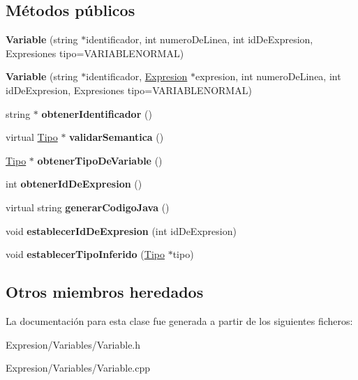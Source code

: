 \subsection*{Métodos públicos}
\begin{DoxyCompactItemize}
\item 
\hypertarget{class_variable_a1ec4d6eb71b53767f57f4fd47af3a857}{{\bfseries Variable} (string $\ast$identificador, int numero\-De\-Linea, int id\-De\-Expresion, Expresiones tipo=V\-A\-R\-I\-A\-B\-L\-E\-N\-O\-R\-M\-A\-L)}\label{class_variable_a1ec4d6eb71b53767f57f4fd47af3a857}

\item 
\hypertarget{class_variable_a141e318ea9d2844ad8bf76441285aa7d}{{\bfseries Variable} (string $\ast$identificador, \hyperlink{class_expresion}{Expresion} $\ast$expresion, int numero\-De\-Linea, int id\-De\-Expresion, Expresiones tipo=V\-A\-R\-I\-A\-B\-L\-E\-N\-O\-R\-M\-A\-L)}\label{class_variable_a141e318ea9d2844ad8bf76441285aa7d}

\item 
\hypertarget{class_variable_a3ef64d8404ca42dad3a600d77f563d10}{string $\ast$ {\bfseries obtener\-Identificador} ()}\label{class_variable_a3ef64d8404ca42dad3a600d77f563d10}

\item 
\hypertarget{class_variable_a183797cf300547948d9b5e9b8bcfc0cc}{virtual \hyperlink{class_tipo}{Tipo} $\ast$ {\bfseries validar\-Semantica} ()}\label{class_variable_a183797cf300547948d9b5e9b8bcfc0cc}

\item 
\hypertarget{class_variable_ac61171e0083625b79c26108167d96fda}{\hyperlink{class_tipo}{Tipo} $\ast$ {\bfseries obtener\-Tipo\-De\-Variable} ()}\label{class_variable_ac61171e0083625b79c26108167d96fda}

\item 
\hypertarget{class_variable_a2258bd5f3ca0919636e86152d1c5782b}{int {\bfseries obtener\-Id\-De\-Expresion} ()}\label{class_variable_a2258bd5f3ca0919636e86152d1c5782b}

\item 
\hypertarget{class_variable_a8909743949ed5e8ec13ebf7957ec7e56}{virtual string {\bfseries generar\-Codigo\-Java} ()}\label{class_variable_a8909743949ed5e8ec13ebf7957ec7e56}

\item 
\hypertarget{class_variable_a5d491f264c62dee55224a550e42eaa19}{void {\bfseries establecer\-Id\-De\-Expresion} (int id\-De\-Expresion)}\label{class_variable_a5d491f264c62dee55224a550e42eaa19}

\item 
\hypertarget{class_variable_accc6f650f21421fef7de01de987d76c4}{void {\bfseries establecer\-Tipo\-Inferido} (\hyperlink{class_tipo}{Tipo} $\ast$tipo)}\label{class_variable_accc6f650f21421fef7de01de987d76c4}

\end{DoxyCompactItemize}
\subsection*{Otros miembros heredados}


La documentación para esta clase fue generada a partir de los siguientes ficheros\-:\begin{DoxyCompactItemize}
\item 
Expresion/\-Variables/Variable.\-h\item 
Expresion/\-Variables/Variable.\-cpp\end{DoxyCompactItemize}
